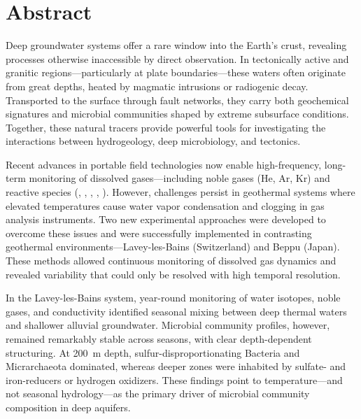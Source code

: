 \begingroup
\let\clearpage\relax
\let\cleardoublepage\relax
\let\cleardoublepage\relax

\chapter*{Abstract}

Deep groundwater systems offer a rare window into the Earth's crust, revealing processes otherwise inaccessible by direct observation.
In tectonically active and granitic regions---particularly at plate boundaries---these waters often originate from great depths, heated by magmatic intrusions or radiogenic decay.
Transported to the surface through fault networks, they carry both geochemical signatures and microbial communities shaped by extreme subsurface conditions.
Together, these natural tracers provide powerful tools for investigating the interactions between hydrogeology, deep microbiology, and tectonics.

Recent advances in portable field technologies now enable high-frequency, long-term monitoring of dissolved gases—including noble gases (He, Ar, Kr) and reactive species (, , , , ).
However, challenges persist in geothermal systems where elevated temperatures cause water vapor condensation and clogging in gas analysis instruments.
Two new experimental approaches were developed to overcome these issues and were successfully implemented in contrasting geothermal environments---Lavey-les-Bains (Switzerland) and Beppu (Japan).
These methods allowed continuous monitoring of dissolved gas dynamics and revealed variability that could only be resolved with high temporal resolution.

In the Lavey-les-Bains system, year-round monitoring of water isotopes, noble gases, and conductivity identified seasonal mixing between deep thermal waters and shallower alluvial groundwater.
Microbial community profiles, however, remained remarkably stable across seasons, with clear depth-dependent structuring.
At \SI{200}{\metre} depth, sulfur-disproportionating Bacteria and Micrarchaeota dominated, whereas deeper zones were inhabited by sulfate- and iron-reducers or hydrogen oxidizers.
These findings point to temperature---and not seasonal hydrology---as the primary driver of microbial community composition in deep aquifers.

